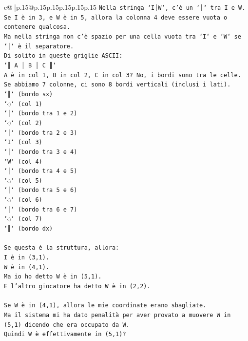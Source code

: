 \documentclass{article}
\begin{document}
{\begin{supertabular}{c@{$\;$}|p{.15\linewidth}@{}p{.15\linewidth}p{.15\linewidth}p{.15\linewidth}p{.15\linewidth}p{.15\linewidth}}
{{{\texttt{Nella stringa `I│W`, c'è un `│` tra I e W.} \\
\texttt{Se I è in 3, e W è in 5, allora la colonna 4 deve essere vuota o contenere qualcosa.} \\
\texttt{Ma nella stringa non c'è spazio per una cella vuota tra `I` e `W` se `│` è il separatore.} \\
\texttt{Di solito in queste griglie ASCII:} \\
\texttt{`║ A │ B │ C ║`} \\
\texttt{A è in col 1, B in col 2, C in col 3? No, i bordi sono tra le celle.} \\
\texttt{Se abbiamo 7 colonne, ci sono 8 bordi verticali (inclusi i lati).} \\
\texttt{`║` (bordo sx)} \\
\texttt{`◌` (col 1)} \\
\texttt{`│` (bordo tra 1 e 2)} \\
\texttt{`◌` (col 2)} \\
\texttt{`│` (bordo tra 2 e 3)} \\
\texttt{`I` (col 3)} \\
\texttt{`│` (bordo tra 3 e 4)} \\
\texttt{`W` (col 4)} \\
\texttt{`│` (bordo tra 4 e 5)} \\
\texttt{`◌` (col 5)} \\
\texttt{`│` (bordo tra 5 e 6)} \\
\texttt{`◌` (col 6)} \\
\texttt{`│` (bordo tra 6 e 7)} \\
\texttt{`◌` (col 7)} \\
\texttt{`║` (bordo dx)} \\
\\ 
\texttt{Se questa è la struttura, allora:} \\
\texttt{I è in (3,1).} \\
\texttt{W è in (4,1).} \\
\texttt{Ma io ho detto W è in (5,1).} \\
\texttt{E l'altro giocatore ha detto W è in (2,2).} \\
\\ 
\texttt{Se W è in (4,1), allora le mie coordinate erano sbagliate.} \\
\texttt{Ma il sistema mi ha dato penalità per aver provato a muovere W in (5,1) dicendo che era occupato da W.} \\
\texttt{Quindi W è effettivamente in (5,1)?} \\
}}}
\end{supertabular}}
\end{document}
